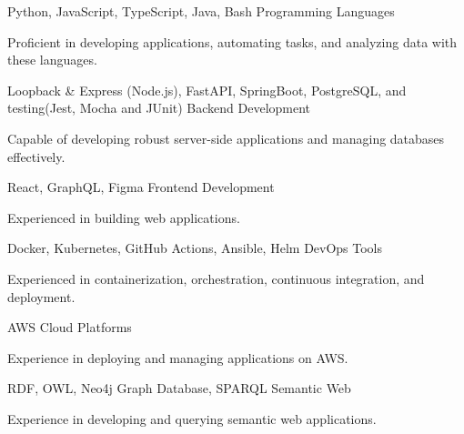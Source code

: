\begin{cventries}
  \cventry
  {Python, JavaScript, TypeScript, Java, Bash}
  {Programming Languages}
  {}
  {}
  {
    \begin{cvitems}
      \item {Proficient in developing applications, automating tasks, and analyzing data with these languages.}
    \end{cvitems}
  }

  \cventry
  {Loopback \& Express (Node.js), FastAPI, SpringBoot, PostgreSQL, and testing(Jest, Mocha and JUnit)}
  {Backend Development}
  {}
  {}
  {
    \begin{cvitems}
      \item{Capable of developing robust server-side applications and managing databases effectively.}
    \end{cvitems}
  }

  \cventry
  {React, GraphQL, Figma}
  {Frontend Development}
  {}
  {}
  {
    \begin{cvitems}
      \item {Experienced in building web applications.}
    \end{cvitems}
  }

  \cventry
  {Docker, Kubernetes, GitHub Actions, Ansible, Helm}
  {DevOps Tools}
  {}
  {}
  {
    \begin{cvitems}
      \item {Experienced in containerization, orchestration, continuous integration, and deployment.}
    \end{cvitems}
  }

  \cventry
  {AWS}
  {Cloud Platforms}
  {}
  {}
  {
    \begin{cvitems}
      \item {Experience in deploying and managing applications on AWS.}
    \end{cvitems}
  }


  \cventry
  {RDF, OWL, Neo4j Graph Database, SPARQL}
  {Semantic Web}
  {}
  {}
  {
    \begin{cvitems}
      \item {Experience in developing and querying semantic web applications.}
    \end{cvitems}
  }

\end{cventries}